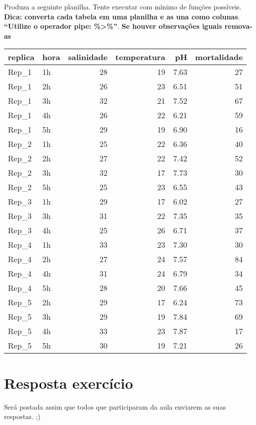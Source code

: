\documentclass[]{book}
\begin{document}
Produza a seguinte planilha. Tente executar com mínimo de funções possíveis. \textbf{Dica: converta cada tabela em uma planilha e as una como colunas}. \textbf{``Utilize o operador pipe: \%\textgreater{}\%''}. \textbf{Se houver observações iguais remova-as}

\begin{tabular}{l|l|r|r|r|r}
\hline
replica & hora & salinidade & temperatura & pH & mortalidade\\
\hline
Rep\_1 & 1h & 28 & 19 & 7.63 & 27\\
\hline
Rep\_1 & 2h & 26 & 23 & 6.51 & 51\\
\hline
Rep\_1 & 3h & 32 & 21 & 7.52 & 67\\
\hline
Rep\_1 & 4h & 26 & 22 & 6.21 & 59\\
\hline
Rep\_1 & 5h & 29 & 19 & 6.90 & 16\\
\hline
Rep\_2 & 1h & 25 & 22 & 6.36 & 40\\
\hline
Rep\_2 & 2h & 27 & 22 & 7.42 & 52\\
\hline
Rep\_2 & 3h & 32 & 17 & 7.73 & 30\\
\hline
Rep\_2 & 5h & 25 & 23 & 6.55 & 43\\
\hline
Rep\_3 & 1h & 29 & 17 & 6.02 & 27\\
\hline
Rep\_3 & 3h & 31 & 22 & 7.35 & 35\\
\hline
Rep\_3 & 4h & 25 & 26 & 6.71 & 37\\
\hline
Rep\_4 & 1h & 33 & 23 & 7.30 & 30\\
\hline
Rep\_4 & 2h & 27 & 24 & 7.57 & 84\\
\hline
Rep\_4 & 4h & 31 & 24 & 6.79 & 34\\
\hline
Rep\_4 & 5h & 28 & 20 & 7.66 & 45\\
\hline
Rep\_5 & 2h & 29 & 17 & 6.24 & 73\\
\hline
Rep\_5 & 3h & 29 & 19 & 7.84 & 69\\
\hline
Rep\_5 & 4h & 33 & 23 & 7.87 & 17\\
\hline
Rep\_5 & 5h & 30 & 19 & 7.21 & 26\\
\hline
\end{tabular}

\hypertarget{resposta-exercuxedcio}{%
\chapter{Resposta exercício}\label{resposta-exercuxedcio}}

Será postada assim que todos que participaram da aula enviarem as suas respostas. ;)
\end{document}
